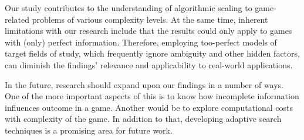 \documentclass[12pt]{article}
\begin{document}
Our study contributes to the understanding of algorithmic scaling to game-related problems of various complexity levels. At the same time, inherent limitations with our research include that the results could only apply to games with (only) perfect information. Therefore, employing too-perfect models of target fields of study, which frequently ignore ambiguity and other hidden factors, can diminish the findings' relevance and applicability to real-world applications.

In the future, research should expand upon our findings in a number of ways. One of the more important aspects of this is to know how incomplete information influences outcome in a game. Another would be to explore computational costs with complexity of the game. In addition to that, developing adaptive search techniques is a promising area for future work.

\end{document}
